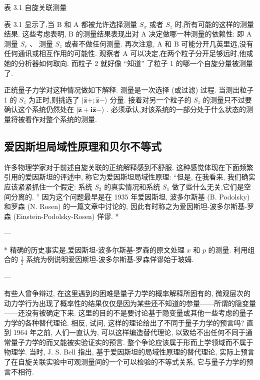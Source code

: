 表 3.1 自旋关联测量


表 3.1 显示了,当 $\mathrm{B}$ 和 $\mathrm{A}$ 都被允许选择测量 ${S}_{x}$ 或者 ${S}_{z}$ 时,所有可能的这样的测量结果. 这些考虑表明, $\mathrm{B}$ 的测量结果表现出对 $\mathrm{A}$ 决定做哪一种测量的依赖性: 即 $\mathrm{A}$ 测量 ${S}_{r}$ 、 测量 ${S}_{z}$ 或者不做任何测量. 再次注意, $\mathrm{A}$ 和 $\mathrm{B}$ 可能分开几英里远,没有任何通讯或相互作用的可能性. 观察者 $\mathrm{A}$ 可以决定,在两个粒子分开足够远时,他或她的分析器如何取向. 而粒子 2 就好像 “知道” 了粒子 1 的哪一个自旋分量被测量了.

正统量子力学对这种情况做如下解释. 测量是一次选择 (或过滤) 过程. 当测出粒子 1 的 ${S}_{z}$ 为正时,则挑选了 $|\widehat{\mathbf{z}} + ;\widehat{\mathbf{z}} - \rangle$ 分量. 接着对另一个粒子的 ${S}_{z}$ 的测量只不过要确认这个系统仍然处在 $|\widehat{\mathbf{z}} + \mathbf{i}\widehat{\mathbf{z}} - \rangle$ . 必须承认,对该系统的一部分处于什么状态的测量将被看作对整个系统的测量.

\subsection{爱因斯坦局域性原理和贝尔不等式}

许多物理学家对于前述自旋关联的正统解释感到不舒服. 这种感觉体现在下面频繁引用的爱因斯坦的评述中, 称它为爱因斯坦局域性原理: “但是, 在我看来, 我们确实应该紧紧抓住一个假定: 系统 ${S}_{2}$ 的真实情况和系统 ${S}_{1}$ 做了些什么无关,它们是空间分离的. ” 因为这个问题最早是在 1935 年爱因斯坦, 波多尔斯基 (B. Podolsky) 和罗森 (N. Rosen) 的一篇文章中讨论的, 因此有时称之为爱因斯坦-波多尔斯基-罗森 (Einstein-Podolsky-Rosen) 佯谬. *

---

* 精确的历史事实是,爱因斯坦-波多尔斯基-罗森的原文处理 $x$ 和 $p$ 的测量. 利用组合的 $\frac{1}{2}$ 系统为例说明爱因斯坦-波多尔斯基-罗森佯谬始于玻姆.

---

有些人曾争辩过, 在这里遇到的困难是量子力学的概率解释所固有的, 微观层次的动力学行为出现了概率性的结果仅仅是因为某些还不知道的参量——所谓的隐变量——还没有被确定下来. 这里的目的不是要讨论基于隐变量或其他一些考虑的量子力学的各种替代理论. 相反, 试问, 这样的理论给出了不同于量子力学的预言吗? 直到 1964 年之前, 人们一直认为, 可以这样编造替代理论, 以致给不出任何不同于通常量子力学的而又能被实验证实的预言. 整个争论应该属于形而上学领域而不属于物理学. 当时, J. S. Bell 指出, 基于爱因斯坦的局域性原理的替代理论, 实际上预言了在自旋关联实验中可观测量间的一个可以检验的不等式关系, 它与量子力学的预言不相符.

